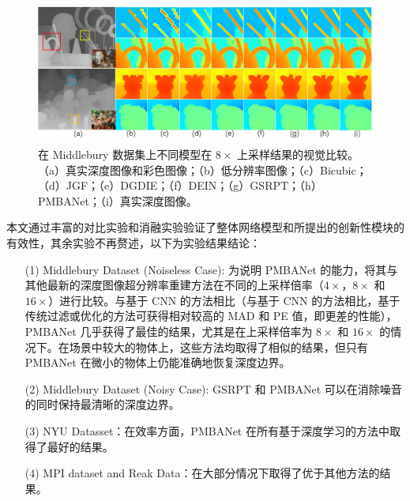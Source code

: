 \documentclass[14px]{article}
\begin{document}
\begin{figure}[!htbp]
\centering
	\includegraphics[width=.7\paperwidth]{img/experiments1.png}
	\caption{在 Middlebury 数据集上不同模型在 $8\times$ 上采样结果的视觉比较。（a）真实深度图像和彩色图像；（b）低分辨率图像；（c）Bicubic；（d）JGF；（e）DGDIE；（f）DEIN；（g）GSRPT；（h）PMBANet；（i）真实深度图像。}
	\label{fig:experiment}
\end{figure}

本文通过丰富的对比实验和消融实验验证了整体网络模型和所提出的创新性模块的有效性，其余实验不再赘述，以下为实验结果结论：

\begin{enumerate}
	\item[(1)] Middlebury Dataset (Noiseless Case): 为说明 PMBANet 的能力，将其与其他最新的深度图像超分辨率重建方法在不同的上采样倍率（$4\times$，$8\times$ 和 $16\times$）进行比较。与基于 CNN 的方法相比（与基于 CNN 的方法相比，基于传统过滤或优化的方法可获得相对较高的 MAD 和 PE 值，即更差的性能），PMBANet 几乎获得了最佳的结果，尤其是在上采样倍率为 $8\times$ 和 $16\times$ 的情况下。在场景中较大的物体上，这些方法均取得了相似的结果，但只有 PMBANet 在微小的物体上仍能准确地恢复深度边界。
	\item[(2)] Middlebury Dataset (Noisy Case): GSRPT 和 PMBANet 可以在消除噪音的同时保持最清晰的深度边界。
	\item[(3)] 	NYU Datasset：在效率方面，PMBANet 在所有基于深度学习的方法中取得了最好的结果。
	\item[(4)] 	MPI dataset and Reak Data：在大部分情况下取得了优于其他方法的结果。
 
\end{enumerate}



%
\end{document}
